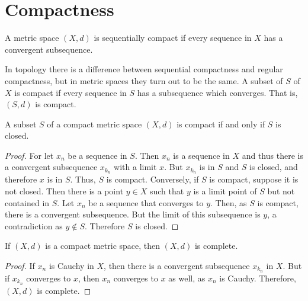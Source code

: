     \section{Compactness}
        \begin{definition}
            A metric space $(X,d)$ is
            sequentially compact if every
            sequence in $X$ has a convergent
            subsequence.
        \end{definition}
        In topology there is a difference
        between sequential compactness
        and regular compactness, but in
        metric spaces they turn out
        to be the same.
        A subset of $S$ of $X$ is
        compact if every sequence in
        $S$ has a subsequence which converges.
        That is, $(S,d)$ is compact.
        \begin{theorem}
            A subset $S$ of a compact
            metric space $(X,d)$ is compact
            if and only if $S$ is closed.
        \end{theorem}
        \begin{proof}
            For let $x_{n}$ be a sequence
            in $S$. Then $x_{n}$ is a
            sequence in $X$ and thus there
            is a convergent subsequence
            $x_{k_{n}}$ with a limit $x$.
            But $x_{k_{n}}$ is in $S$ and
            $S$ is closed, and therefore
            $x$ is in $S$. Thus, $S$
            is compact. Conversely, if
            $S$ is compact, suppose it is
            not closed. Then there is a point
            $y\in{X}$ such that $y$ is a
            limit point of $S$ but not
            contained in $S$. Let
            $x_{n}$ be a sequence that
            converges to $y$. Then, as
            $S$ is compact, there is
            a convergent subsequence. But
            the limit of this subsequence
            is $y$, a contradiction as
            $y\notin{S}$. Therefore $S$
            is closed.
        \end{proof}
        \begin{theorem}
            If $(X,d)$ is a compact metric
            space, then
            $(X,d)$ is complete.
        \end{theorem}
        \begin{proof}
            If $x_{n}$ is Cauchy in $X$,
            then there is a convergent
            subsequence $x_{k_{n}}$
            in $X$. But if $x_{k_{n}}$
            converges to $x$, then
            $x_{n}$ converges to $x$ as
            well, as $x_{n}$ is Cauchy.
            Therefore, $(X,d)$ is complete.
        \end{proof}
